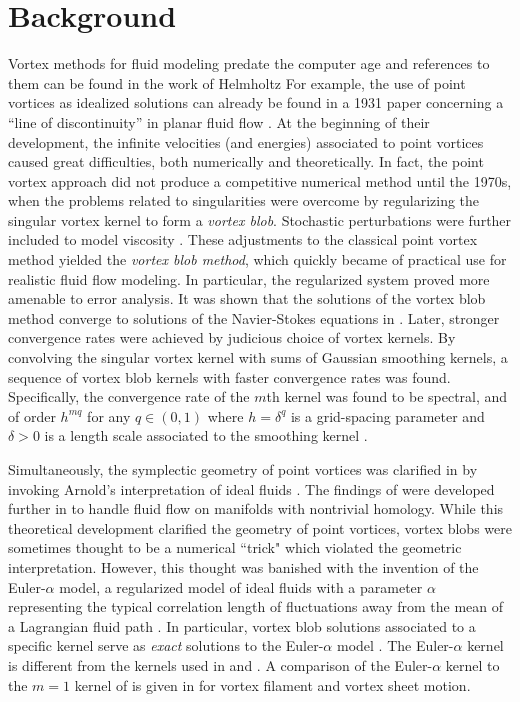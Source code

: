 \documentclass[12pt]{amsart}
\theoremstyle{remark}
\begin{document}
\section{Background}
\label{sec:background}
Vortex methods for fluid modeling predate the computer age
and references to them can be found in the work of Helmholtz \cite[see the introductory section]{Smith2011}
For example, the use of point vortices as idealized solutions can already be found in a 1931 paper concerning a ``line of discontinuity'' in planar fluid flow \cite{Rosenhead1931}.
At the beginning of their development, the infinite velocities (and energies) associated to point vortices caused great difficulties, both numerically and theoretically.
In fact, the point vortex approach did not produce a competitive numerical method until the 1970s, when the problems related to singularities were overcome by regularizing the singular vortex kernel to form a \emph{vortex blob}.
Stochastic perturbations were further included to model viscosity \cite{Chorin1973}.
These adjustments to the classical point vortex method yielded the \emph{vortex blob method}, which quickly became of practical use for realistic fluid flow modeling.
In particular, the regularized system proved more amenable to error analysis.
It was shown that the solutions of the vortex blob method converge to solutions of the Navier-Stokes equations in \cite{Hald1979}.
Later, stronger convergence rates were achieved by judicious choice of vortex kernels.
By convolving the singular vortex kernel with sums of Gaussian smoothing kernels, a sequence of vortex blob kernels with faster convergence rates was found.
Specifically, the convergence rate of the $m$th kernel was found to be spectral, and of order $h^{mq}$ for any $q \in (0,1)$ where $h = \delta^q$
is a grid-spacing parameter and $\delta > 0$ is a length scale associated to the smoothing kernel \cite{BealeMajda1982,BealeMajda1985}.

Simultaneously, the symplectic geometry of point vortices was clarified in \cite{MarsdenWeinstein1983}
by invoking Arnold's interpretation of ideal fluids \cite{Arnold1966}.
The findings of \cite{MarsdenWeinstein1983} were developed further in \cite{GayBalmazVizman2012} to handle fluid flow on manifolds with nontrivial homology.
While this theoretical development clarified the geometry of point vortices, vortex blobs were sometimes thought to be a numerical ``trick" which violated the geometric interpretation.
However, this thought was banished with the invention of the Euler-$\alpha$ model, a regularized model of ideal fluids with a parameter $\alpha$ representing the typical correlation length of fluctuations away from the mean of a Lagrangian fluid path \cite{FoiasHolmTiti2001}. In particular, vortex blob solutions associated to a specific kernel serve as \emph{exact} solutions to the Euler-$\alpha$ model \cite{OliverShkoller2001}.
The Euler-$\alpha$ kernel is different from the kernels used in \cite{Chorin1973} and \cite{BealeMajda1985}.
A comparison of the Euler-$\alpha$ kernel to the $m=1$ kernel of \cite{BealeMajda1985} is given in \cite{HolmNitschePutkaradze2006} for vortex filament and vortex sheet motion.
\end{document}
